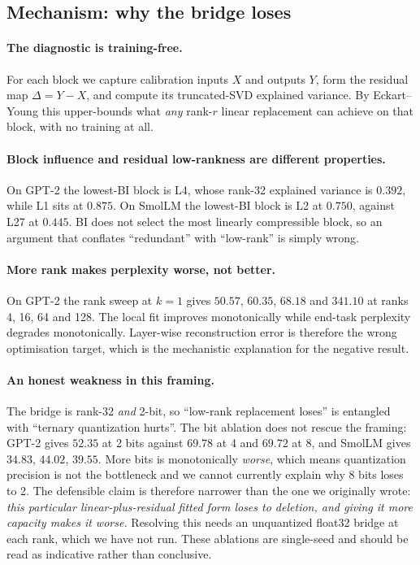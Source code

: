 \documentclass[11pt]{article}
\begin{document}
\subsection{Mechanism: why the bridge loses}
\paragraph{The diagnostic is training-free.} For each block we capture
calibration inputs $X$ and outputs $Y$, form the residual map
$\Delta = Y - X$, and compute its truncated-SVD explained variance. By
Eckart--Young this upper-bounds what \emph{any} rank-$r$ linear replacement can
achieve on that block, with no training at all.

\paragraph{Block influence and residual low-rankness are different
properties.} On GPT-2 the lowest-BI block is L4, whose rank-32 explained
variance is $0.392$, while L1 sits at $0.875$. On SmolLM the lowest-BI block
is L2 at $0.750$, against L27 at $0.445$. BI does not select the most linearly
compressible block, so an argument that conflates ``redundant'' with
``low-rank'' is simply wrong.

\paragraph{More rank makes perplexity worse, not better.} On GPT-2 the rank
sweep at $k=1$ gives $50.57$, $60.35$, $68.18$ and $341.10$ at ranks 4, 16,
64 and 128. The local fit improves monotonically while end-task perplexity
degrades monotonically. Layer-wise reconstruction error is therefore the wrong
optimisation target, which is the mechanistic explanation for the negative
result.

\paragraph{An honest weakness in this framing.} The bridge is rank-32
\emph{and} 2-bit, so ``low-rank replacement loses'' is entangled with
``ternary quantization hurts''. The bit ablation does not rescue the framing:
GPT-2 gives $52.35$ at 2 bits against $69.78$ at 4 and $69.72$ at 8, and
SmolLM gives $34.83$, $44.02$, $39.55$. More bits is monotonically \emph{worse},
which means quantization precision is not the bottleneck and we cannot
currently explain why 8 bits loses to 2. The defensible claim is therefore
narrower than the one we originally wrote: \emph{this particular
linear-plus-residual fitted form loses to deletion, and giving it more capacity
makes it worse.} Resolving this needs an unquantized float32 bridge at each
rank, which we have not run. These ablations are single-seed and should be
read as indicative rather than conclusive.
\end{document}
